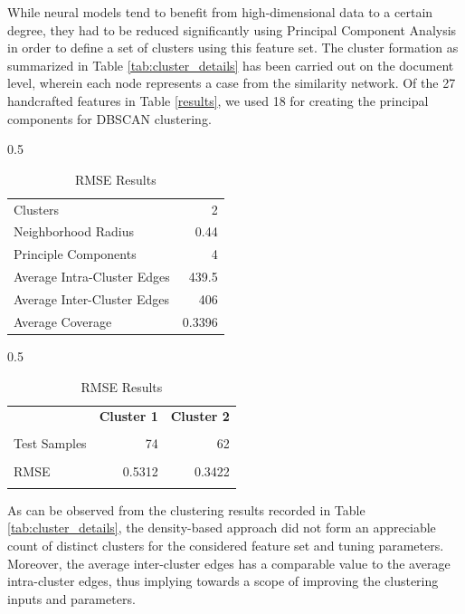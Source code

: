 \documentclass[12pt]{ceurart}
\begin{document}
While neural models tend to benefit from high-dimensional data to a certain degree, they had to be reduced significantly using Principal Component Analysis in order to define a set of clusters using this feature set. The cluster formation as summarized in Table \ref{tab:cluster_details} has been carried out on the document level, wherein each node represents a case from the similarity network. Of the 27 handcrafted features in Table \ref{results}, we used 18 for creating the principal components for DBSCAN clustering.

\begin{table}[!htb]
    \caption{Details of our study on text clustering for case similarity}
    \label{tab:temps}
    \begin{subtable}[t]{0.5\textwidth}
    \centering
    \begin{tabularx}{\textwidth}{Xr} %
    \hline
    Clusters    & 2   \\
    Neighborhood Radius     & 0.44 \\
    Principle Components     & 4 \\
    Average Intra-Cluster Edges    & 439.5 \\
    Average Inter-Cluster Edges & 406 \\
    Average Coverage & 0.3396 \\
    \hline
    \end{tabularx}
    \caption{Details of DBSCAN Clusters }
    \label{tab:cluster_details}
    \end{subtable}%
    \hfill%
    \begin{subtable}[t]{0.5\textwidth}
    \centering
    \begin{tabularx}{\textwidth}{Xrr} %
    \hline
    \textbf{}   & \textbf{Cluster 1}             & \textbf{Cluster 2} \\
    \\
    Test Samples      & 74                & 62          \\
    \\
    RMSE    & 0.5312       & 0.3422   \\ 
    \\
    \hline
    \end{tabularx}
    \caption{RMSE Results}
    \label{rmse}
    \end{subtable}
\end{table}

As can be observed from the clustering results recorded in Table \ref{tab:cluster_details}, the density-based approach did not form an appreciable count of distinct clusters for the considered feature set and tuning parameters. Moreover, the average inter-cluster edges has a comparable value to the average intra-cluster edges, thus implying towards a scope of improving the clustering inputs and parameters.
\end{document}
